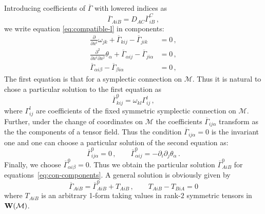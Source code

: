 \documentclass[a4paper,11pt]{amsart}
\numberwithin{thm}{section} %
\numberwithin{equation}{section} %
\numberwithin{figure}{section} %
\renewcommand{\:}{{\rm\, :\,}}
\def\bar{\overline}
\def\d{\partial}
\newcommand{\dl}[1]{\displaystyle\frac{{\d}}{\d #1}}
\newcommand{\ddd}[3]{\displaystyle\frac{{{\d}^2 #1}}{\d #2 \d #3}}
\def\manM{{\mathcal M}}
\def\W{{\bf W}}
\def\con{{\bar\Gamma}}
\begin{document}
Introducing coefficients of $\con$ with lowered
indices as
\begin{equation}
  \con_{AiB}=D_{AC}\con^C_{iB}\,,
\end{equation}
we write equation \eqref{eq:compatible-l} in components:
\begin{equation}
\begin{split}
\dl{x^i} \omega_{jk}+\con_{kij}-\con_{jik}&=0\,,\\
\ddd{}{x^i}{x^j}{\theta_\alpha}
+\con_{\alpha ij}-\con_{ji\alpha}&=0\,,\\
\con_{\alpha i \beta}-\con_{\beta i \alpha}&=0\,,
\end{split}
  \label{eq:con-components}
\end{equation}
The first equation is that for a symplectic connection
on $\manM$. Thus it is natural to chose a particular solution
to the first equation as
\begin{equation}
\con^0_{kij}=\omega_{kl}\Gamma^l_{ij}\,,
  \label{eq:first}
\end{equation}
where $\Gamma^l_{ij}$ are coefficients of the fixed symmetric
symplectic connection on $\manM$.  Further, under the change of
coordinates on $\manM$ the coefficients
$\con_{i j \alpha}$ transform as the the components of a tensor field.
Thus the condition $\con_{ij \alpha}=0$ is the invariant one and one
can choose a particular solution of the second equation as:
\begin{equation}
\con^0_{ij \alpha}=0\,, \qquad
\con^0_{\alpha i j}=-\d_i\d_j \theta_\alpha\,.
\end{equation}
Finally, we choose $\con^0_{\alpha i \beta}=0$.  Thus
we obtain the particular solution $\con^0_{AiB}$ for
equations~\eqref{eq:con-components}. A general solution
is obviously given by
\begin{equation}
  \con_{AiB}=\con^0_{AiB}+T_{AiB}\,, \qquad T_{AiB}-T_{BiA}=0
  \label{eq:con-general}
\end{equation}
where $T_{AiB}$ is an arbitrary 1-form taking values in rank-$2$
symmetric tensors in $\W(\manM)$.
\end{document}
